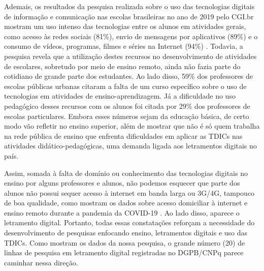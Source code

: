 \documentclass{textolivre}
\begin{document}
Ademais, os resultados da pesquisa realizada sobre o uso das tecnologias digitais de informação e comunicação nas escolas brasileiras no ano de 2019 pelo CGI.br mostram um uso intenso das tecnologias entre os alunos em atividades gerais, como acesso às redes sociais (81\%), envio de mensagens por aplicativos (89\%) e o consumo de vídeos, programas, filmes e séries na Internet (94\%) \cite{comite_gestor_da_internet_no_brasil_resumo_2019}. Todavia, a pesquisa revela que a utilização destes recursos no desenvolvimento de atividades de escolares, sobretudo por meio de ensino remoto, ainda não fazia parte do cotidiano de grande parte dos estudantes. Ao lado disso, 59\% dos professores de escolas públicas urbanas citaram a falta de um curso específico sobre o uso de tecnologias em atividades de ensino-aprendizagem. Já a dificuldade no uso pedagógico desses recursos com os alunos foi citada por 29\% dos professores de escolas particulares. Embora esses números sejam da educação básica, de certo modo vão refletir no ensino superior, além de mostrar que não é só quem trabalha na rede pública de ensino que enfrenta dificuldades em aplicar as TDICs nas atividades didático-pedagógicas, uma demanda ligada aos letramentos digitais no país. 

Assim, somada à falta de domínio ou conhecimento das tecnologias digitais no ensino por alguns professores e alunos, não podemos esquecer que parte dos alunos não possui sequer acesso à internet em banda larga ou 3G/4G, tampouco de boa qualidade, como mostram os dados sobre acesso domiciliar à internet e ensino remoto durante a pandemia da COVID-19 \cite{nascimento_acesso_2020}. Ao lado disso, aparece o letramento digital. Portanto, todas essas constatações reforçam a necessidade do desenvolvimento de pesquisas enfocando ensino, letramentos digitais e uso das TDICs. Como mostram os dados da nossa pesquisa, o grande número (20) de linhas de pesquisa em letramento digital registradas no DGPB/CNPq parece caminhar nessa direção.

\printbibliography\label{sec-bib}
\end{document}
